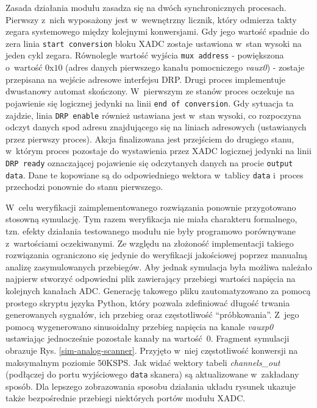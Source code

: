 Zasada działania modułu zasadza się na dwóch synchronicznych procesach. Pierwszy z~nich wyposażony jest w~wewnętrzny licznik, który odmierza takty zegara systemowego między kolejnymi konwersjami. Gdy jego wartość spadnie do zera linia \verb|start conversion| bloku XADC zostaje ustawiona w~stan wysoki na jeden cykl zegara. Równolegle wartość wyjścia \verb|mux address| - powiększona o~wartość $0$x$10$ (adres danych pierwszego kanału pomocniczego \textit{vaux0}) - zostaje przepisana na wejście adresowe interfejsu DRP. Drugi proces implementuje dwustanowy automat skończony. W~pierwszym ze stanów proces oczekuje na pojawienie się logicznej jedynki na linii \verb|end of conversion|. Gdy sytuacja ta zajdzie, linia \verb|DRP enable| również ustawiana jest w~stan wysoki, co rozpoczyna odczyt danych spod adresu znajdującego się na liniach adresowych (ustawianych przez pierwszy proces). Akcja finalizowana jest przejściem do drugiego stanu, w~którym proces pozostaje do wystawienia przez XADC logicznej jedynki na linii \verb|DRP ready| oznaczającej pojawienie się odczytanych danych na procie \verb|output data|. Dane te kopowiane są do odpowiedniego wektora w~tablicy \verb|data| i~proces przechodzi ponownie do stanu pierwszego.

W~celu weryfikacji zaimplementowanego rozwiązania ponownie przygotowano stosowną symulację. Tym razem weryfikacja nie miała charakteru formalnego, tzn. efekty działania testowanego modułu nie były programowo porównywane z~wartościami oczekiwanymi. Ze względu na złożoność implementacji takiego rozwiązania ograniczono się jedynie do weryfikacji jakościowej poprzez manualną analizę zasymulowanych przebiegów. Aby jednak symulacja była możliwa należało najpierw stworzyć odpowiedni plik zawierający przebiegi wartości napięcia na kolejnych kanałach ADC. Generację takowego pliku zautomatyzowano za pomocą prostego skryptu języka Python, który pozwala zdefiniować długość trwania generowanych sygnałów, ich przebieg oraz częstotliwość ``próbkowania''. Z~jego pomocą wygenerowano sinusoidalny przebieg napięcia na kanale \textit{vauxp0} ustawiając jednocześnie pozostałe kanały na wartość~$0$. Fragment symulacji obrazuje Rys. \ref{sim-analog-scanner}. Przyjęto w~niej częstotliwość konwersji na maksymalnym poziomie 50KSPS. Jak widać wektory tabeli \textit{channels\_out} (podłączej do portu wyjściowego \verb|data| skanera) są aktualizowane w~zakładany sposób. Dla lepszego zobrazowania sposobu działania układu rysunek ukazuje także bezpośrednie przebiegi niektórych portów modułu XADC. 

